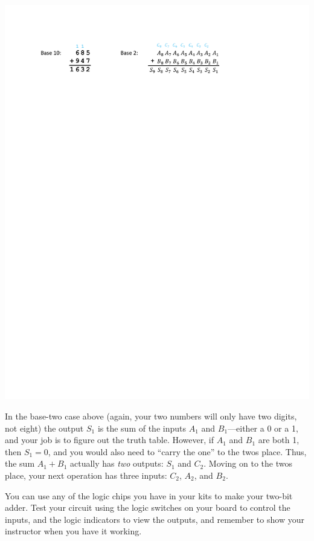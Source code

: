 \begin{center}
\includegraphics{digital_electronics/addition_example.pdf}
\end{center}

In the base-two case above (again, your two numbers will only have two digits, not eight) the output $S_1$ is the sum of the inputs $A_1$ and $B_1$---either a 0 or a 1, and your job is to figure out the truth table.  However, if $A_1$ and $B_1$ are both 1, then $S_1 =0$, and you would also need to ``carry the one'' to the twos place.  Thus, the sum $A_1 + B_1$ actually has \textit{two} outputs: $S_1$ and $C_2$.  Moving on to the twos place, your next operation has three inputs: $C_2$, $A_2$, and $B_2$.

You can use any of the logic chips you have in your kits to make your two-bit adder.  Test your circuit using the logic switches on your board to control the inputs, and the logic indicators to view the outputs, and remember to show your instructor when you have it working.

